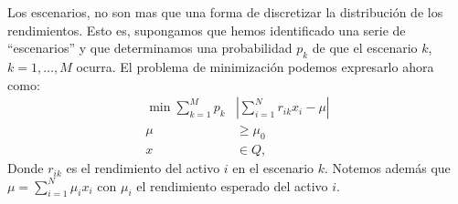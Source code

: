 \documentclass{beamer}
\begin{document}
    \begin{frame}
        Los escenarios, no son mas que una forma de discretizar la distribución de los rendimientos. Esto es, supongamos que hemos identificado una serie de ``escenarios'' y que determinamos una probabilidad $p_k$ de que el escenario $k$, $k=1, \ldots, M$ ocurra. El problema de minimización podemos expresarlo ahora como:
        \begin{align*}
            \min \sum_{k=1}^M p_k&\left\vert\sum_{i=1}^{N} r_{ik}x_i-\mu\right\vert \\
            \mu&\geq \mu_0\\
            x& \in Q,
        \end{align*}
        Donde $r_{ik}$ es el rendimiento del activo $i$ en el escenario $k$. Notemos además que  $\mu = \sum_{i=1}^N\mu_i x_i$ con $\mu_i$ el rendimiento esperado del activo $i$.
    \end{frame}
\end{document}
